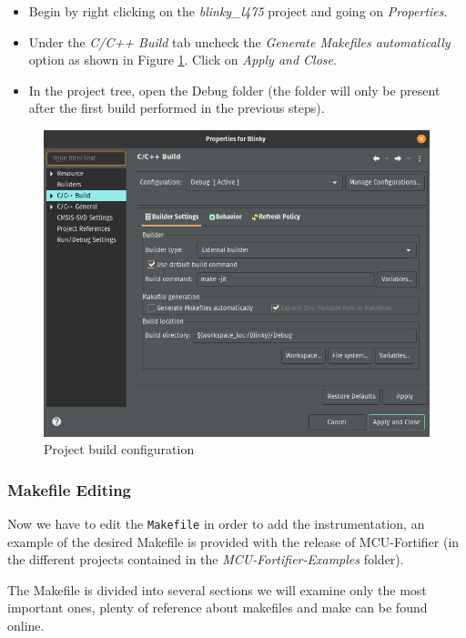 \documentclass{article}
\begin{document}
\begin{itemize}
    \item Begin by right clicking on the \textit{blinky\_l475} project and going on \textit{Properties}.
    \item Under the \textit{C/C++ Build} tab uncheck the \textit{Generate Makefiles automatically} option as shown in Figure \ref{fig:auto_make}. Click on \textit{Apply and Close}.
    \item In the project tree, open the Debug folder (the folder will only be present after the first build performed in the previous steps).
\end{itemize}

\begin{figure}
\centering
\includegraphics[scale=.4]{images/auto_make.png}
\caption{Project build configuration}
\label{fig:auto_make}
\end{figure}

\subsubsection{Makefile Editing}
Now we have to edit the \verb|Makefile| in order to add the instrumentation, an example of the desired Makefile is provided with the release of MCU-Fortifier (in the different projects contained in the \textit{MCU-Fortifier-Examples} folder).

The Makefile is divided into several sections we will examine only the most important ones, plenty of reference about makefiles and make can be found online.
\end{document}
